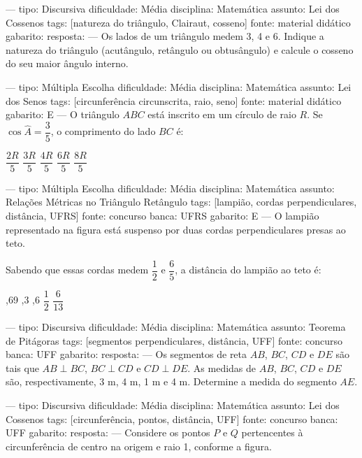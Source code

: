 ---
tipo: Discursiva
dificuldade: Média
disciplina: Matemática
assunto: Lei dos Cossenos
tags: [natureza do triângulo, Clairaut, cosseno]
fonte: material didático
gabarito:
resposta:
---
\question
Os lados de um triângulo medem 3, 4 e 6. Indique a natureza do triângulo (acutângulo, retângulo ou obtusângulo) e calcule o cosseno do seu maior ângulo interno.

---
tipo: Múltipla Escolha
dificuldade: Média
disciplina: Matemática
assunto: Lei dos Senos
tags: [circunferência circunscrita, raio, seno]
fonte: material didático
gabarito: E
---
\question
O triângulo $ABC$ está inscrito em um círculo de raio $R$. Se $\cos\hat{A} = \dfrac{3}{5}$, o comprimento do lado $BC$ é:
\begin{choices}
\choice $\dfrac{2R}{5}$
\choice $\dfrac{3R}{5}$
\choice $\dfrac{4R}{5}$
\choice $\dfrac{6R}{5}$
\correctchoice $\dfrac{8R}{5}$
\end{choices}

---
tipo: Múltipla Escolha
dificuldade: Média
disciplina: Matemática
assunto: Relações Métricas no Triângulo Retângulo
tags: [lampião, cordas perpendiculares, distância, UFRS]
fonte: concurso
banca: UFRS
gabarito: E
---
\question
O lampião representado na figura está suspenso por duas cordas perpendiculares presas ao teto.


Sabendo que essas cordas medem $\dfrac{1}{2}$ e $\dfrac{6}{5}$, a distância do lampião ao teto é:
\begin{choices}
,69
,3
,6
\choice $\dfrac{1}{2}$
\correctchoice $\dfrac{6}{13}$
\end{choices}

---
tipo: Discursiva
dificuldade: Média
disciplina: Matemática
assunto: Teorema de Pitágoras
tags: [segmentos perpendiculares, distância, UFF]
fonte: concurso
banca: UFF
gabarito:
resposta:
---
\question
Os segmentos de reta $AB$, $BC$, $CD$ e $DE$ são tais que $AB \perp BC$, $BC \perp CD$ e $CD \perp DE$. As medidas de $AB$, $BC$, $CD$ e $DE$ são, respectivamente, 3 m, 4 m, 1 m e 4 m. Determine a medida do segmento $AE$.

---
tipo: Discursiva
dificuldade: Média
disciplina: Matemática
assunto: Lei dos Cossenos
tags: [circunferência, pontos, distância, UFF]
fonte: concurso
banca: UFF
gabarito:
resposta:
---
\question
Considere os pontos $P$ e $Q$ pertencentes à circunferência de centro na origem e raio 1, conforme a figura.


